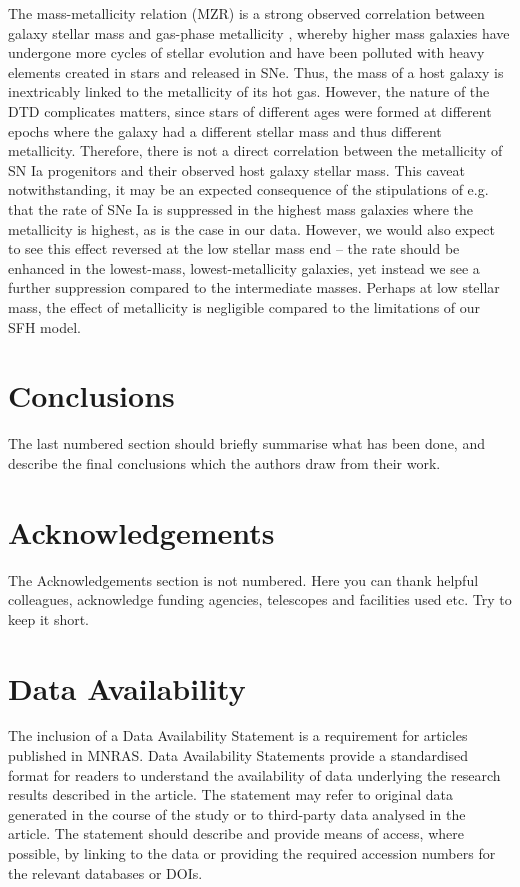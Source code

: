 \documentclass[fleqn,usenatbib]{mnras}
\begin{document}
The mass-metallicity relation (MZR) is a strong observed correlation between galaxy stellar mass and gas-phase metallicity \citep[e.g.][]{Tremonti2004}, whereby higher mass galaxies have undergone more cycles of stellar evolution and have been polluted with heavy elements created in stars and released in SNe. Thus, the mass of a host galaxy is inextricably linked to the metallicity of its hot gas. However, the nature of the DTD complicates matters, since stars of different ages were formed at different epochs where the galaxy had a different stellar mass and thus different metallicity. Therefore, there is not a direct correlation between the metallicity of SN Ia progenitors and their observed host galaxy stellar mass.  This caveat notwithstanding, it may be an expected consequence of the stipulations of e.g. \citet{Kistler2013} that the rate of SNe Ia is suppressed in the highest mass galaxies where the metallicity is highest, as is the case in our data. However, we would also expect to see this effect reversed at the low stellar mass end -- the rate should be enhanced in the lowest-mass, lowest-metallicity galaxies, yet instead we see a further suppression compared to the intermediate masses. Perhaps at low stellar mass, the effect of metallicity is negligible compared to the limitations of our SFH model.


\section{Conclusions}
\label{sec:conclusion}
The last numbered section should briefly summarise what has been done, and describe
the final conclusions which the authors draw from their work.

\section*{Acknowledgements}

The Acknowledgements section is not numbered. Here you can thank helpful
colleagues, acknowledge funding agencies, telescopes and facilities used etc.
Try to keep it short.

\section*{Data Availability}

 
The inclusion of a Data Availability Statement is a requirement for articles published in MNRAS. Data Availability Statements provide a standardised format for readers to understand the availability of data underlying the research results described in the article. The statement may refer to original data generated in the course of the study or to third-party data analysed in the article. The statement should describe and provide means of access, where possible, by linking to the data or providing the required accession numbers for the relevant databases or DOIs.
\end{document}

